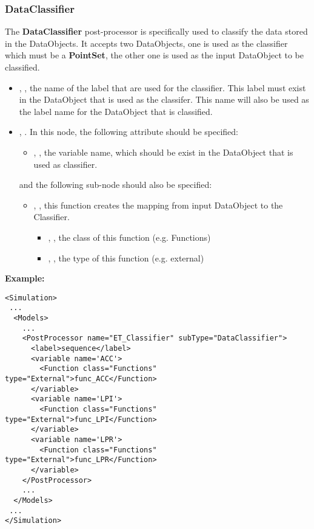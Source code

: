 \subsubsection{DataClassifier}
\label{DataClassifierPP}
The \textbf{DataClassifier} post-processor is specifically used to classify the data stored in the DataObjects. It
accepts two DataObjects, one is used as the classifier which must be a \textbf{PointSet}, the other one is used
as the input DataObject to be classified. 
%
%
\begin{itemize}
  \item {}, , the name of the label that are used for the classifier. This
    label must exist in the DataObject that is used as the classifer. This name will also be used as
    the label name for the DataObject that is classified.
  \item {}, . In this node, the following attribute should be specified: 
    \begin{itemize}
      \item {}, , the variable name, which should be exist in
        the DataObject that is used as classifier.
    \end{itemize}
    and the following sub-node should also be specified:
    \begin{itemize}
      \item {}, , this function creates the mapping from input DataObject
        to the Classifier.
        \begin{itemize}
          \item {}, , the class of this function (e.g. Functions)
          \item {}, , the type of this function (e.g. external)
        \end{itemize}
    \end{itemize}
\end{itemize}

\textbf{Example:}

\begin{lstlisting}[style=XML]
<Simulation>
 ...
  <Models>
    ...
    <PostProcessor name="ET_Classifier" subType="DataClassifier">
      <label>sequence</label>
      <variable name='ACC'>
        <Function class="Functions" type="External">func_ACC</Function>
      </variable>
      <variable name='LPI'>
        <Function class="Functions" type="External">func_LPI</Function>
      </variable>
      <variable name='LPR'>
        <Function class="Functions" type="External">func_LPR</Function>
      </variable>
    </PostProcessor>
    ...
  </Models>
 ...
</Simulation>
\end{lstlisting}

